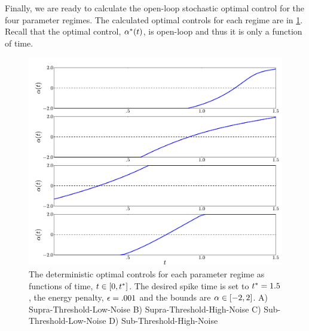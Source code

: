 \documentclass[12pt]{iopart}
\begin{document}
Finally, we are ready to calculate the open-loop stochastic optimal control for
the four parameter regimes. The calculated optimal controls for each regime are
in \cref{fig:FBK_Regimes_cs}. Recall that the optimal control, ${\alpha}^*(t)$, is
open-loop and thus it is only a function of time.
\begin{figure}[htp]
\begin{center}
  \includegraphics[width=.99\textwidth]{Figs/FP_Adjoint/Regimes_cs.pdf}
  \caption[labelInTOC]{The deterministic optimal controls for each parameter
  regime as functions of time, $t \in [0, { t^* }]$.
  The desired spike time is set to ${ t^* }=1.5$, the energy penalty, ${\epsilon}
  = .001$ and the bounds are ${\alpha} \in [-2,2]$.
  A) Supra-Threshold-Low-Noise B) Supra-Threshold-High-Noise
C) Sub-Threshold-Low-Noise   D) Sub-Threshold-High-Noise  }
  \label{fig:FBK_Regimes_cs}
\end{center}
\end{figure}
\end{document}
